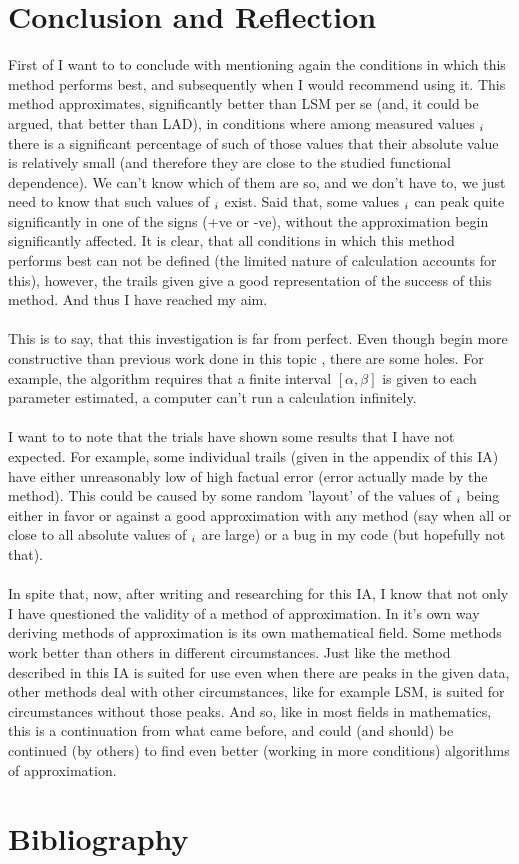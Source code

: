 \documentclass[11pt,a4paper]{article}
\numberwithin{equation}{subsection}
\begin{document}
\section{Conclusion and Reflection}
First of I want to to conclude with mentioning again the conditions in which this method performs best, and subsequently when I would recommend using it. This method approximates, significantly better than LSM per se (and, it could be argued, that better than LAD), in conditions where among measured values $\title{y}_{i}$ there is a significant percentage of such of those values that their absolute value is relatively small (and therefore they are close to the studied functional dependence). We can't know which of them are so, and we don't have to, we just need to know that such values of $\title{y}_{i}$ exist. Said that, some values $\title{y}_{i}$ can peak quite significantly in one of the signs (+ve or -ve), without the approximation begin significantly affected. It is clear, that all conditions in which this method performs best can not be defined (the limited nature of calculation accounts for this), however, the trails given give a good representation of the success of this method.  And thus I have reached my aim. \\
\\
This is to say, that this investigation is far from perfect. Even though begin more constructive than previous work \cite{balk2010regression} done in this topic , there are some holes. For example, the algorithm requires that a finite interval $[\alpha, \beta]$ is given to each parameter estimated, a computer can't run a calculation infinitely. \\
\\
I want to to note that the trials have shown  some results that I have not expected. For example, some individual trails (given in the appendix of this IA) have either unreasonably low of high factual error (error actually made by the method). This could be caused by some random 'layout' of the values of $\title{y}_{i}$ being either in favor or against a good approximation with any method (say when all or close to all absolute values of $\title{y}_{i}$ are large) or a bug in my code (but hopefully not that). \\
\\
In spite that, now, after writing and researching for this IA, I know that not only I have questioned the validity of a method of approximation. In it's own way deriving methods of approximation is its own mathematical field. Some methods work better than others in different circumstances. Just like the method described in this IA is suited for use even when there are peaks in the given data, other methods deal with other circumstances, like for example LSM, is suited for circumstances without those peaks. And so, like in most fields in mathematics, this is a continuation from what came before, and could (and should) be continued (by others) to find even better (working in more conditions) algorithms of approximation.



\newpage
\section{Bibliography}


\end{document}

